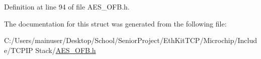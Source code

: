 Definition at line 94 of file A\+E\+S\+\_\+\+O\+F\+B.\+h.



The documentation for this struct was generated from the following file\+:\begin{DoxyCompactItemize}
\item 
C\+:/\+Users/mainuser/\+Desktop/\+School/\+Senior\+Project/\+Eth\+Kit\+T\+C\+P/\+Microchip/\+Include/\+T\+C\+P\+I\+P Stack/\hyperlink{_a_e_s___o_f_b_8h}{A\+E\+S\+\_\+\+O\+F\+B.\+h}\end{DoxyCompactItemize}
